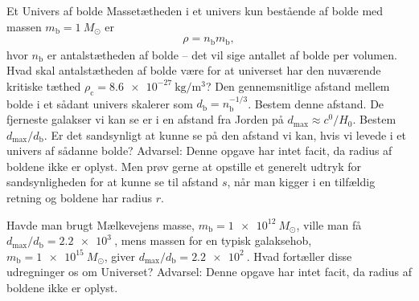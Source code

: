 \begin{opgave}{Et Univers af bolde}
Massetætheden i et univers kun bestående af bolde med massen $m_\mathrm{b} = \SI{1}{M_\odot}$ er
%
\begin{align} \label{eq:antalsdensitet}
    \rho = n_\mathrm{b}m_\mathrm{b},
\end{align}
%
hvor $n_\mathrm{b}$ er antalstætheden af bolde -- det vil sige antallet af bolde per volumen.
\opg Hvad skal antalstætheden af bolde være for at universet har den nuværende kritiske tæthed $\rho_\text{c} = \SI{8.6e-27}{\kilo\gram\per\cubic\metre}$?
\opg Den gennemsnitlige afstand mellem bolde i et sådant univers skalerer som $d_\mathrm{b} = n_\mathrm{b}^{-1/3}$. Bestem denne afstand.
\opg De fjerneste galakser vi kan se er i en afstand fra Jorden på $d_\mathrm{max} \approx \si{\clight}/H_0$. Bestem $d_\mathrm{max}/d_\mathrm{b}$.
\opg Er det sandsynligt at kunne se på den afstand vi kan, hvis vi levede i et univers af sådanne bolde? Advarsel: Denne opgave har intet facit, da radius af boldene ikke er oplyst. Men prøv gerne at opstille et generelt udtryk for sandsynligheden for at kunne se til afstand $s$, når man kigger i en tilfældig retning og boldene har radius $r$.

\opg Havde man brugt Mælkevejens masse, $m_\mathrm{b} = \SI{1e12}{M_\odot}$, ville man få $d_\mathrm{max}/d_\mathrm{b} = \SI{2.2e3}{}$, mens massen for en typisk galaksehob, $m_\mathrm{b} = \SI{1e15}{M_\odot}$, giver $d_\mathrm{max}/d_\mathrm{b} = \SI{2.2e2}{}$. Hvad fortæller disse udregninger os om Universet? Advarsel: Denne opgave har intet facit, da radius af boldene ikke er oplyst.
\end{opgave}

